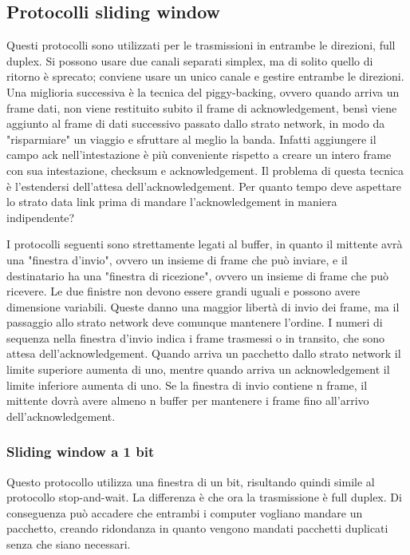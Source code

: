 \subsection{Protocolli sliding window} %
Questi protocolli sono utilizzati per le trasmissioni in entrambe le direzioni, full duplex.
Si possono usare due canali separati simplex, ma di solito quello di ritorno è sprecato; conviene usare un unico canale e gestire entrambe le direzioni.
Una miglioria successiva è la tecnica del piggy-backing, ovvero quando arriva un frame dati, non viene restituito subito il frame di acknowledgement, 
bensì viene aggiunto al frame di dati successivo passato dallo strato network, in modo da "risparmiare" un viaggio e sfruttare al meglio la banda.
Infatti aggiungere il campo ack nell'intestazione è più conveniente rispetto a creare un intero frame con sua intestazione, checksum e acknowledgement.
Il problema di questa tecnica è l'estendersi dell'attesa dell'acknowledgement.
Per quanto tempo deve aspettare lo strato data link prima di mandare l'acknowledgement in maniera indipendente?

I protocolli seguenti sono strettamente legati al buffer, in quanto il mittente avrà una "finestra d'invio", ovvero un insieme di frame che può inviare,
e il destinatario ha una "finestra di ricezione", ovvero un insieme di frame che può ricevere.
Le due finistre non devono essere grandi uguali e possono avere dimensione variabili.
Queste danno una maggior libertà di invio dei frame, ma il passaggio allo strato network deve comunque mantenere l'ordine.
I numeri di sequenza nella finestra d'invio indica i frame trasmessi o in transito, che sono attesa dell'acknowledgement.
Quando arriva un pacchetto dallo strato network il limite superiore aumenta di uno, mentre quando arriva un acknowledgement il limite inferiore aumenta di uno.
Se la finestra di invio contiene n frame, il mittente dovrà avere almeno n buffer per mantenere i frame fino all'arrivo dell'acknowledgement.

\subsubsection{Sliding window a 1 bit}
Questo protocollo utilizza una finestra di un bit, risultando quindi simile al protocollo stop-and-wait.
La differenza è che ora la trasmissione è full duplex.
Di conseguenza può accadere che entrambi i computer vogliano mandare un pacchetto,
creando ridondanza in quanto vengono mandati pacchetti duplicati senza che siano necessari.


